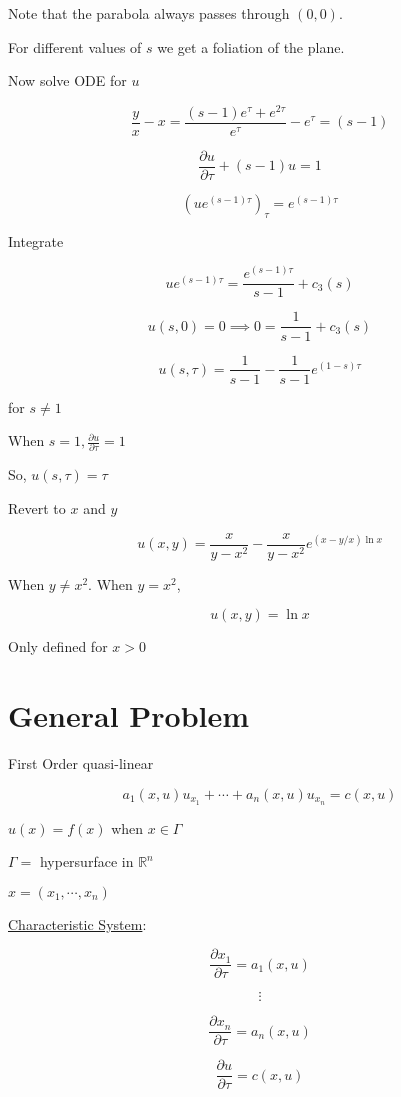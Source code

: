 \documentclass{article}
\theoremstyle{definition}
\begin{document}
Note that the parabola always passes through \((0,0)\).

For different values of \(s\) we get a foliation of the plane.

Now solve ODE for \(u\) 

\[
    \frac{y}{x} - x = \frac{(s-1)e^\tau + e^{2\tau}}{e^\tau} - e^\tau = (s-1)
\]

\[
    \frac{\partial u}{\partial \tau} + (s-1) u = 1
\]

\[
    (u e^{(s-1)\tau})_\tau = e^{(s-1)\tau}
\]

Integrate

\[
    u e^{(s-1)\tau} = \frac{e^{(s-1)\tau}}{s-1} + c_3(s)
\]

\[
    u(s,0) = 0 \implies 0 = \frac{1}{s-1} + c_3(s)
\]

\[
    u(s,\tau) = \boxed{ \frac{1}{s-1} - \frac{1}{s-1} e^{(1-s)\tau} }
\]

for \(s \neq 1\)

When \(s=1, \frac{\partial u}{\partial \tau} = 1\)

So, \(u(s,\tau) = \tau\) 

Revert to \(x\) and \(y\) 

\[
    \boxed{u(x,y) = \frac{x}{y - x^2} - \frac{x}{y-x^2} e^{\left( x - y / x \right) \ln x}}
\]

When \(y \neq x^2\). When \(y=x^2\),

\[
    \boxed{u(x,y) = \ln x}
\]

Only defined for \(x > 0\) 

\section*{General Problem}

First Order quasi-linear

\[
    a_1(x,u) u_{x_1} + \cdots + a_n(x,u) u_{x_n} = c(x,u)
\]

\(u(x) = f(x)\) when \(x\in \Gamma \)

\(\Gamma =\) hypersurface in \(\mathbb{R}^n\)  

\(x = (x_1,\cdots, x_n)\) 

\underline{Characteristic System}:

\[
    \frac{\partial x_1}{\partial \tau} = a_1(x,u)
\]

\[
    \vdots
\]

\[
    \frac{\partial x_n}{\partial \tau} = a_n(x,u)
\]

\[
    \frac{\partial u}{\partial \tau} = c(x,u)
\]
\end{document}
